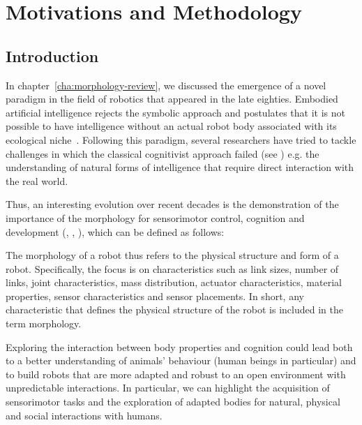 
\chapter{Motivations and Methodology}
\label{cha:methodology}

\section{Introduction} %

In chapter~\ref{cha:morphology-review}, we discussed the emergence of a novel paradigm in the field of robotics that appeared in the late eighties.  Embodied artificial intelligence rejects the symbolic approach and postulates that it is not possible to have intelligence without an actual robot body associated with its ecological niche~\parencite{pfeifer2001understanding}. Following this paradigm, several researchers have tried to tackle challenges in which the classical cognitivist approach failed (see \parencite{brooks1986achieving}) e.g. the understanding of natural forms of intelligence that require direct interaction with the real world.

Thus, an interesting evolution over recent decades is the demonstration of the importance of the morphology for sensorimotor control, cognition and development (\cite{kaplan2008corps}, \cite{steels1995artificial}, \cite{Pfeifer06}), which can be defined as follows:
\begin{formal}
    The morphology of a robot thus refers to the physical structure and form of a robot. Specifically, the focus is on characteristics such as link sizes, number of links, joint characteristics, mass distribution, actuator characteristics, material properties, sensor characteristics and sensor placements. In short, any characteristic that defines the physical structure of the robot is included in the term morphology.
\end{formal}

Exploring the interaction between body properties and cognition could lead both to a better understanding of animals’ behaviour (human beings in particular) and to build robots that are more adapted and robust to an open environment with unpredictable interactions. In particular, we can highlight the acquisition of sensorimotor tasks and the exploration of adapted bodies for natural, physical and social interactions with humans.

